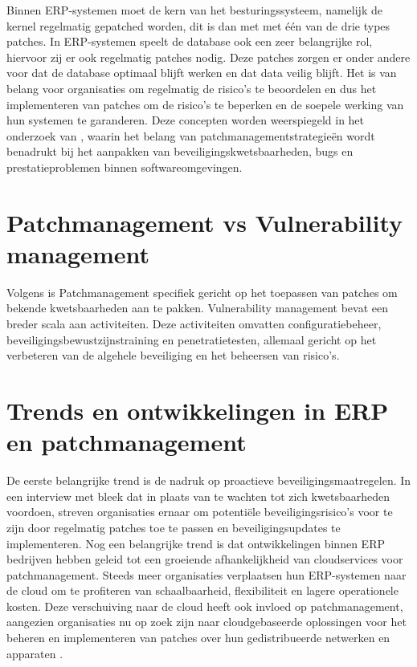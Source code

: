 Binnen ERP-systemen moet de kern van het besturingssysteem, namelijk de kernel regelmatig gepatched worden, dit is dan met met één van de drie types patches. In ERP-systemen speelt de database ook een zeer belangrijke rol, hiervoor zij er ook regelmatig patches nodig. Deze patches zorgen er onder andere
voor dat de database optimaal blijft werken en dat data veilig blijft. Het is van belang voor organisaties om regelmatig de risico's te beoordelen en dus het implementeren van patches om de risico's te beperken en de soepele werking van hun systemen te garanderen.
Deze concepten worden weerspiegeld in het onderzoek van \textcite{Wrobel2023}, waarin het belang van patchmanagementstrategieën wordt benadrukt bij het aanpakken van beveiligingskwetsbaarheden, bugs en prestatieproblemen binnen softwareomgevingen.

\section{Patchmanagement vs Vulnerability management}
Volgens \textcite{Danby2023} is Patchmanagement specifiek gericht op het toepassen van patches om bekende kwetsbaarheden aan te pakken. Vulnerability management bevat een breder scala aan activiteiten. Deze activiteiten omvatten configuratiebeheer, beveiligingsbewustzijnstraining en penetratietesten, allemaal gericht op het verbeteren van de algehele beveiliging en het beheersen van risico’s.


\section{Trends en ontwikkelingen in  ERP en patchmanagement}

De eerste belangrijke trend is de nadruk op proactieve beveiligingsmaatregelen.
In een interview met \textcite{Munck2024} bleek dat in plaats van te wachten tot zich kwetsbaarheden voordoen, streven organisaties ernaar om potentiële beveiligingsrisico's voor te zijn door regelmatig patches toe te passen en beveiligingsupdates te implementeren.
Nog een belangrijke trend is dat ontwikkelingen binnen ERP bedrijven hebben geleid tot een groeiende afhankelijkheid van cloudservices voor patchmanagement.
Steeds meer organisaties verplaatsen hun ERP-systemen naar de cloud om te profiteren van schaalbaarheid, flexibiliteit en lagere operationele kosten.
Deze verschuiving naar de cloud heeft ook invloed op patchmanagement, aangezien organisaties nu op zoek zijn naar cloudgebaseerde oplossingen voor het beheren en implementeren van patches over hun gedistribueerde netwerken en apparaten \autocite{Kannan2023}. 

